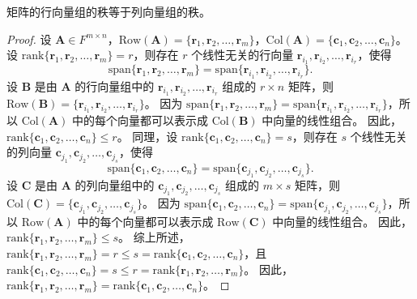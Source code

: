 \begin{proposition}
    矩阵的行向量组的秩等于列向量组的秩。
    \label{prop:row_col_rank}
\end{proposition}
\begin{proof}
    设 $\mathbf{A} \in F^{m \times n}$，$\mathrm{Row}(\mathbf{A}) = \{\mathbf{r}_1,\mathbf{r}_2,\ldots,\mathbf{r}_m\}$，$\mathrm{Col}(\mathbf{A}) = \{\mathbf{c}_1,\mathbf{c}_2,\ldots,\mathbf{c}_n\}$。
    设 $\mathrm{rank}\{\mathbf{r}_1,\mathbf{r}_2,\ldots,\mathbf{r}_m\} = r$，则存在 $r$ 个线性无关的行向量 $\mathbf{r}_{i_1},\mathbf{r}_{i_2},\ldots,\mathbf{r}_{i_r}$，使得
    \[
        \mathrm{span}\{\mathbf{r}_1,\mathbf{r}_2,\ldots,\mathbf{r}_m\} = \mathrm{span}\{\mathbf{r}_{i_1},\mathbf{r}_{i_2},\ldots,\mathbf{r}_{i_r}\}.
    \]
    设 $\mathbf{B}$ 是由 $\mathbf{A}$ 的行向量组中的 $\mathbf{r}_{i_1},\mathbf{r}_{i_2},\ldots,\mathbf{r}_{i_r}$ 组成的 $r \times n$ 矩阵，则 $\mathrm{Row}(\mathbf{B}) = \{\mathbf{r}_{i_1},\mathbf{r}_{i_2},\ldots,\mathbf{r}_{i_r}\}$。
    因为 $\mathrm{span}\{\mathbf{r}_1,\mathbf{r}_2,\ldots,\mathbf{r}_m\} = \mathrm{span}\{\mathbf{r}_{i_1},\mathbf{r}_{i_2},\ldots,\mathbf{r}_{i_r}\}$，所以 $\mathrm{Col}(\mathbf{A})$ 中的每个向量都可以表示成 $\mathrm{Col}(\mathbf{B})$ 中向量的线性组合。
    因此，$\mathrm{rank}\{\mathbf{c}_1,\mathbf{c}_2,\ldots,\mathbf{c}_n\} \leq r$。
    同理，设 $\mathrm{rank}\{\mathbf{c}_1,\mathbf{c}_2,\ldots,\mathbf{c}_n\} = s$，则存在 $s$ 个线性无关的列向量 $\mathbf{c}_{j_1},\mathbf{c}_{j_2},\ldots,\mathbf{c}_{j_s}$，使得
    \[
        \mathrm{span}\{\mathbf{c}_1,\mathbf{c}_2,\ldots,\mathbf{c}_n\} = \mathrm{span}\{\mathbf{c}_{j_1},\mathbf{c}_{j_2},\ldots,\mathbf{c}_{j_s}\}.
    \]
    设 $\mathbf{C}$ 是由 $\mathbf{A}$ 的列向量组中的 $\mathbf{c}_{j_1},\mathbf{c}_{j_2},\ldots,\mathbf{c}_{j_s}$ 组成的 $m \times s$ 矩阵，则 $\mathrm{Col}(\mathbf{C}) = \{\mathbf{c}_{j_1},\mathbf{c}_{j_2},\ldots,\mathbf{c}_{j_s}\}$。
    因为 $\mathrm{span}\{\mathbf{c}_1,\mathbf{c}_2,\ldots,\mathbf{c}_n\} = \mathrm{span}\{\mathbf{c}_{j_1},\mathbf{c}_{j_2},\ldots,\mathbf{c}_{j_s}\}$，所以 $\mathrm{Row}(\mathbf{A})$ 中的每个向量都可以表示成 $\mathrm{Row}(\mathbf{C})$ 中向量的线性组合。
    因此，$\mathrm{rank}\{\mathbf{r}_1,\mathbf{r}_2,\ldots,\mathbf{r}_m\} \leq s$。
    综上所述，$\mathrm{rank}\{\mathbf{r}_1,\mathbf{r}_2,\ldots,\mathbf{r}_m\} = r \leq s = \mathrm{rank}\{\mathbf{c}_1,\mathbf{c}_2,\ldots,\mathbf{c}_n\}$，且 $\mathrm{rank}\{\mathbf{c}_1,\mathbf{c}_2,\ldots,\mathbf{c}_n\} = s \leq r = \mathrm{rank}\{\mathbf{r}_1,\mathbf{r}_2,\ldots,\mathbf{r}_m\}$。
    因此，$\mathrm{rank}\{\mathbf{r}_1,\mathbf{r}_2,\ldots,\mathbf{r}_m\} = \mathrm{rank}\{\mathbf{c}_1,\mathbf{c}_2,\ldots,\mathbf{c}_n\}$。
\end{proof}
\vspace{1em}

